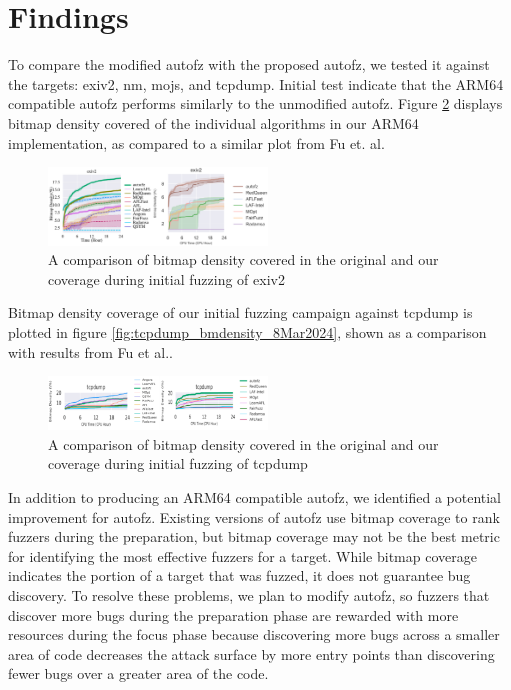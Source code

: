\section{Findings}

To compare the  modified autofz with the proposed autofz, we tested it against the 
targets: exiv2, nm, mojs, and tcpdump. Initial test indicate that the ARM64 compatible 
autofz performs similarly to the unmodified autofz. Figure \ref{fig:exiv2_compare_orig_arm64} 
displays bitmap density covered of the individual algorithms in our ARM64 implementation, 
as compared to a similar plot from Fu et. al\cite{fu_autofz_2023}.

\begin{figure}
    \includegraphics[width=0.52\textwidth]{figs/exiv2_compare_orig_arm64.png}
    \centering
    \caption{A comparison of bitmap density covered in the original\cite{fu_autofz_2023} and our 
    coverage during initial fuzzing of exiv2}
    \label{fig:exiv2_compare_orig_arm64}
\end{figure}

Bitmap density coverage of our initial fuzzing campaign against tcpdump is plotted 
in figure \ref{fig:tcpdump_bmdensity_8Mar2024}, shown as a comparison with results 
from Fu et al.\cite{fu_autofz_2023}.

\begin{figure}
    \includegraphics[width=0.52\textwidth]{figs/tcp_compare_orig_arm64.png}
    \centering
    \caption{A comparison of bitmap density covered in the original\cite{fu_autofz_2023} and our 
    coverage during initial fuzzing of tcpdump}
    \label{fig:exiv2_compare_orig_arm64}
\end{figure}

In addition to producing an ARM64 compatible autofz, we identified a potential improvement for autofz.
Existing versions of autofz use bitmap coverage to rank fuzzers during the preparation, but bitmap
coverage may not be the best metric for identifying the most effective fuzzers for a target. While
bitmap coverage indicates the portion of a target that was fuzzed, it does not guarantee bug discovery.
To resolve these problems, we plan to modify autofz, so fuzzers that discover more bugs during the
preparation phase are rewarded with more resources during the focus phase because discovering more bugs
across a smaller area of code decreases the attack surface by more entry points than discovering fewer
bugs over a greater area of the code.